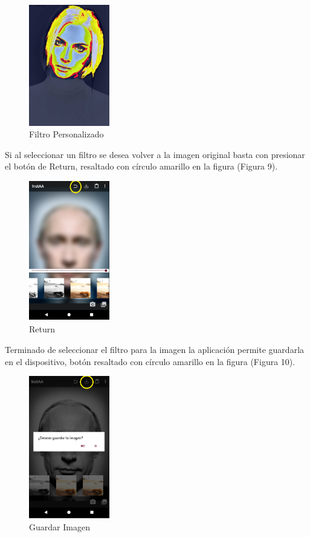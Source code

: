 \documentclass[journal]{IEEEtran}
\begin{document}
	\begin{figure}[h]
		\centering
		\includegraphics[width = 100pt]{filtrop.jpg}
		\caption{Filtro Personalizado}
	\end{figure}

	
	Si al seleccionar un filtro se desea volver a la imagen original basta con presionar el botón de Return, resaltado con círculo amarillo en la figura (Figura 9).
	\begin{figure}[h]
		\centering
		\includegraphics[width = 100pt]{return.png}
		\caption{Return}
	\end{figure}	

	Terminado de seleccionar el filtro para la imagen la aplicación permite guardarla en el dispositivo,  botón resaltado con círculo amarillo en la figura (Figura 10).
	
	\begin{figure}[h]
		\centering
		\includegraphics[width = 100pt]{guardar.png}
		\caption{Guardar Imagen}
	\end{figure}
	
\end{document}
